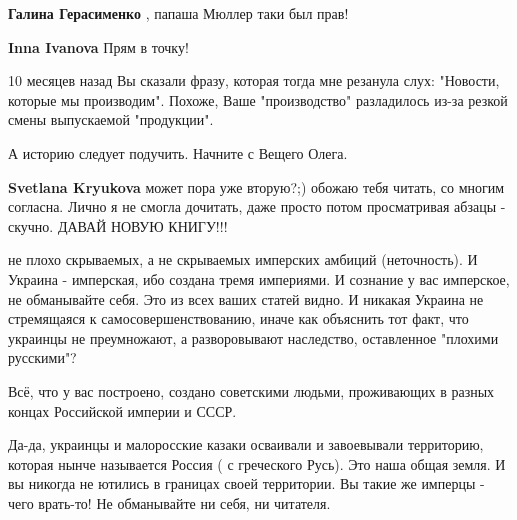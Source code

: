 \begin{itemize}
\begin{itemize}
\textbf{Галина Герасименко} , папаша Мюллер таки был прав!

 
\textbf{Inna Ivanova} Прям в точку!
\end{itemize}

 
10 месяцев назад Вы сказали фразу, которая тогда мне резанула слух: "Новости,
которые мы производим". Похоже, Ваше "производство" разладилось из-за резкой
смены выпускаемой "продукции".

А историю следует подучить. Начните с Вещего Олега.

 

\textbf{Svetlana Kryukova} может пора уже вторую?;) обожаю тебя читать, со многим согласна. Лично я не смогла дочитать, даже просто потом просматривая абзацы - скучно. ДАВАЙ НОВУЮ КНИГУ!!!

 

не плохо скрываемых, а не скрываемых имперских амбиций (неточность). И Украина
- имперская, ибо создана тремя империями. И сознание у вас имперское, не
обманывайте себя. Это из всех ваших статей видно. И никакая Украина не
стремящаяся к самосовершенствованию, иначе как объяснить тот факт, что украинцы
не преумножают, а разворовывают наследство, оставленное "плохими русскими"?

Всё, что у вас построено, создано советскими людьми, проживающих в разных
концах Российской империи и СССР. 

Да-да, украинцы и малоросские казаки осваивали и завоевывали территорию,
которая нынче называется Россия ( с греческого Русь). Это наша общая земля. И
вы никогда не ютились в границах своей территории. Вы такие же имперцы - чего
врать-то! Не обманывайте ни себя, ни читателя. 


\end{itemize}
